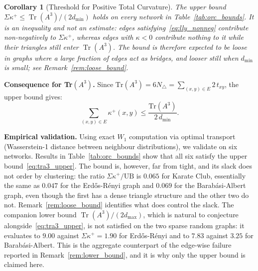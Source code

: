 \documentclass[11pt,a4paper]{article}
\newtheorem{corollary}{Corollary}
\begin{document}
\begin{corollary}[Threshold for Positive Total Curvature]
\label{cor:positive_total}
The upper bound $\Sigma\kappa^+ \leq \operatorname{Tr}(A^3)/(2d_{\min})$
holds on every network in Table~\ref{tab:orc_bounds}. It is an
inequality and not an estimate: edges satisfying~\eqref{eq:lly_nonneg}
contribute non-negatively to $\Sigma\kappa^+$, whereas edges with
$\kappa < 0$ contribute nothing to it while their triangles still
enter $\operatorname{Tr}(A^3)$. The bound is therefore expected to be
loose in graphs where a large fraction of edges act as bridges, and
looser still when $d_{\min}$ is small; see
Remark~\ref{rem:loose_bound}.
\end{corollary}

\textbf{Consequence for Tr$(A^3)$.}
Since $\text{Tr}(A^3) = 6N_\triangle = \sum_{(x,y)\in E} 2\,t_{xy}$,
the upper bound gives:
\begin{equation}
\sum_{(x,y) \in E} \kappa^+(x,y) \leq
\frac{\text{Tr}(A^3)}{2\,d_{\min}}.
\label{eq:tra3_upper}
\end{equation}

\textbf{Empirical validation.}
Using exact $W_1$ computation via optimal transport (Wasserstein-1
distance between neighbour distributions), we validate on six
networks. Results in Table~\ref{tab:orc_bounds} show that all six
satisfy the upper bound~\eqref{eq:tra3_upper}. The bound is, however,
far from tight, and its slack does not order by clustering: the ratio
$\Sigma\kappa^+/\text{UB}$ is $0.065$ for Karate Club, essentially the
same as $0.047$ for the Erd\H{o}s-R\'{e}nyi graph and $0.069$ for the
Barab\'{a}si-Albert graph, even though the first has a dense triangle
structure and the other two do not. Remark~\ref{rem:loose_bound}
identifies what does control the slack. The companion lower bound
$\operatorname{Tr}(A^3)/(2d_{\max})$, which is natural to conjecture
alongside~\eqref{eq:tra3_upper}, is not satisfied on the two sparse
random graphs: it evaluates to $9.00$ against $\Sigma\kappa^+ = 1.90$
for Erd\H{o}s-R\'{e}nyi and to $7.83$ against $3.25$ for
Barab\'{a}si-Albert. This is the aggregate counterpart of the
edge-wise failure reported in Remark~\ref{rem:lower_bound}, and it is
why only the upper bound is claimed here.
\end{document}
